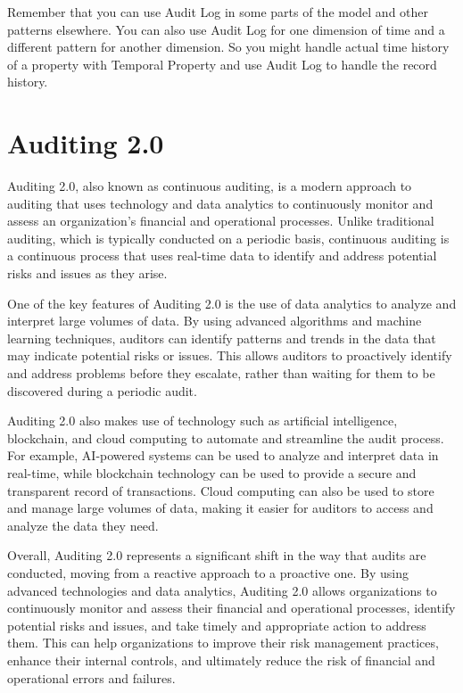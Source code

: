 Remember that you can use Audit Log in some parts of the model and other patterns elsewhere. You can also use Audit Log for one dimension of time and a different pattern for another dimension. So you might handle actual time history of a property with Temporal Property and use Audit Log to handle the record history.

\section{Auditing 2.0}

Auditing 2.0, also known as continuous auditing, is a modern approach to auditing that uses technology and data analytics to continuously monitor and assess an organization's financial and operational processes. Unlike traditional auditing, which is typically conducted on a periodic basis, continuous auditing is a continuous process that uses real-time data to identify and address potential risks and issues as they arise.

One of the key features of Auditing 2.0 is the use of data analytics to analyze and interpret large volumes of data. By using advanced algorithms and machine learning techniques, auditors can identify patterns and trends in the data that may indicate potential risks or issues. This allows auditors to proactively identify and address problems before they escalate, rather than waiting for them to be discovered during a periodic audit.

Auditing 2.0 also makes use of technology such as artificial intelligence, blockchain, and cloud computing to automate and streamline the audit process. For example, AI-powered systems can be used to analyze and interpret data in real-time, while blockchain technology can be used to provide a secure and transparent record of transactions. Cloud computing can also be used to store and manage large volumes of data, making it easier for auditors to access and analyze the data they need.

Overall, Auditing 2.0 represents a significant shift in the way that audits are conducted, moving from a reactive approach to a proactive one. By using advanced technologies and data analytics, Auditing 2.0 allows organizations to continuously monitor and assess their financial and operational processes, identify potential risks and issues, and take timely and appropriate action to address them. This can help organizations to improve their risk management practices, enhance their internal controls, and ultimately reduce the risk of financial and operational errors and failures.

